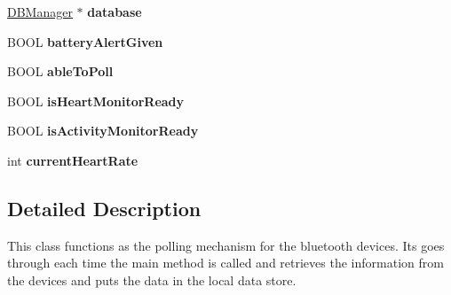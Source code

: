 \begin{DoxyCompactItemize}
\item 
\hypertarget{interface_device_poll_manager_a66a02f95a478a42c7e45986317e3c6c1}{\hyperlink{interface_d_b_manager}{D\-B\-Manager} $\ast$ {\bfseries database}}\label{interface_device_poll_manager_a66a02f95a478a42c7e45986317e3c6c1}

\item 
\hypertarget{interface_device_poll_manager_a8d5b5ff2c336f0dd2cb2b9e088850072}{B\-O\-O\-L {\bfseries battery\-Alert\-Given}}\label{interface_device_poll_manager_a8d5b5ff2c336f0dd2cb2b9e088850072}

\item 
\hypertarget{interface_device_poll_manager_abe71cba97ae5b0faef77e70b78f2bef2}{B\-O\-O\-L {\bfseries able\-To\-Poll}}\label{interface_device_poll_manager_abe71cba97ae5b0faef77e70b78f2bef2}

\item 
\hypertarget{interface_device_poll_manager_a4735e7c0b634e8693ac8d33a0456d39f}{B\-O\-O\-L {\bfseries is\-Heart\-Monitor\-Ready}}\label{interface_device_poll_manager_a4735e7c0b634e8693ac8d33a0456d39f}

\item 
\hypertarget{interface_device_poll_manager_aeab69bf0530fcf7d3f1b01c785e17bd2}{B\-O\-O\-L {\bfseries is\-Activity\-Monitor\-Ready}}\label{interface_device_poll_manager_aeab69bf0530fcf7d3f1b01c785e17bd2}

\item 
\hypertarget{interface_device_poll_manager_a302b6434aa606031f78f721c9e40f0cf}{int {\bfseries current\-Heart\-Rate}}\label{interface_device_poll_manager_a302b6434aa606031f78f721c9e40f0cf}

\end{DoxyCompactItemize}


\subsection{Detailed Description}
This class functions as the polling mechanism for the bluetooth devices. Its goes through each time the main method is called and retrieves the information from the devices and puts the data in the local data store. 

